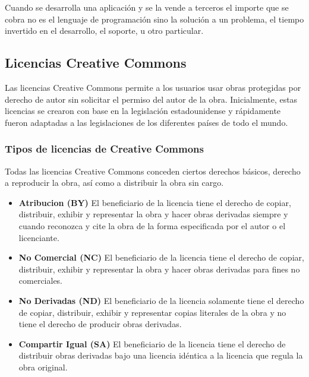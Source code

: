 				Cuando se desarrolla una aplicación y se la vende a terceros el importe que se cobra no es el lenguaje de programación sino la solución a un problema, el tiempo invertido en el desarrollo, el soporte, u otro particular.\par
			
		\subsection{Licencias Creative Commons}
		
			Las licencias Creative Commons permite a los usuarios usar obras protegidas por derecho de autor sin solicitar el permiso del autor de la obra. Inicialmente, estas licencias se crearon con base en la legislación estadounidense y rápidamente fueron adaptadas a las legislaciones de los diferentes países de todo el mundo.
			
			\subsubsection{Tipos de licencias de Creative Commons}	
			
				
				Todas las licencias Creative Commons conceden ciertos derechos básicos, derecho a reproducir la obra, así como a distribuir la obra sin cargo.\par
					
				\begin{itemize}
					
					\item \textbf{Atribucion (BY)} El beneficiario de la licencia tiene el derecho de copiar, distribuir, exhibir y representar la obra y hacer obras derivadas siempre y cuando reconozca y cite la obra de la forma especificada por el autor o el licenciante.
				
					\item \textbf{No Comercial (NC)} El beneficiario de la licencia tiene el derecho de copiar, distribuir, exhibir y representar la obra y hacer obras derivadas para fines no comerciales.
					
					\item \textbf{No Derivadas (ND)} El beneficiario de la licencia solamente tiene el derecho de copiar, distribuir, exhibir y representar copias literales de la obra y no tiene el derecho de producir obras derivadas.
					
					\item \textbf{Compartir Igual (SA)} El beneficiario de la licencia tiene el derecho de distribuir obras derivadas bajo una licencia idéntica a la licencia que regula la obra original.	 
					
				\end{itemize}
				
	
				